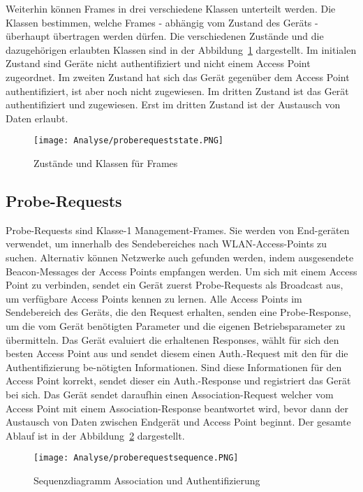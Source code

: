\clearpage 

Weiterhin können Frames in drei verschiedene Klassen unterteilt werden.
Die Klassen bestimmen, welche Frames - abhängig vom Zustand des Geräts - 
überhaupt übertragen werden dürfen.
Die verschiedenen Zustände und die dazugehörigen erlaubten Klassen sind 
in der Abbildung~\ref{figure:proberequeststate} dargestellt.
Im initialen Zustand sind Geräte nicht authentifiziert und nicht einem
Access Point zugeordnet. 
Im zweiten Zustand hat sich das Gerät gegenüber dem Access Point authentifiziert,
ist aber noch nicht zugewiesen.
Im dritten Zustand ist das Gerät authentifiziert und zugewiesen.
Erst im dritten Zustand ist der Austausch von Daten erlaubt.

\begin{figure}[h!]
	\centering
	\texttt{[image: Analyse/proberequeststate.PNG]}
	\caption{Zustände und Klassen für Frames
	\label{figure:proberequeststate}}
\end{figure}

\clearpage

\subsection{Probe-Requests}
Probe-Requests sind Klasse-1 Management-Frames. Sie werden von End-geräten 
verwendet, um innerhalb des Sendebereiches nach WLAN-Access-Points zu suchen. 
Alternativ können Netzwerke auch gefunden werden, 
indem ausgesendete Beacon-Messages der Access Points empfangen werden.
Um sich mit einem Access Point zu verbinden, sendet ein Gerät zuerst 
Probe-Requests als Broadcast aus, um verfügbare Access Points kennen zu lernen.
Alle Access Points im Sendebereich des Geräts, die den Request erhalten,
senden eine Probe-Response, um die vom Gerät benötigten Parameter 
und die eigenen Betriebsparameter zu übermitteln. 
Das Gerät evaluiert die erhaltenen Responses, wählt für sich den 
besten Access Point aus und sendet diesem einen Auth.-Request
mit den für die Authentifizierung be-nötigten Informationen. Sind diese 
Informationen für den Access Point korrekt, sendet dieser
ein Auth.-Response und registriert das Gerät bei sich.
Das Gerät sendet daraufhin einen Association-Request welcher vom Access
Point mit einem Association-Response beantwortet wird, bevor dann der 
Austausch von Daten zwischen Endgerät und Access Point beginnt.
Der gesamte Ablauf ist in der Abbildung~\ref{figure:proberequestsequence} 
dargestellt.

\begin{figure}[h!]
	\centering
	\texttt{[image: Analyse/proberequestsequence.PNG]}
	\caption{Sequenzdiagramm Association und Authentifizierung
	\label{figure:proberequestsequence}}
\end{figure}

